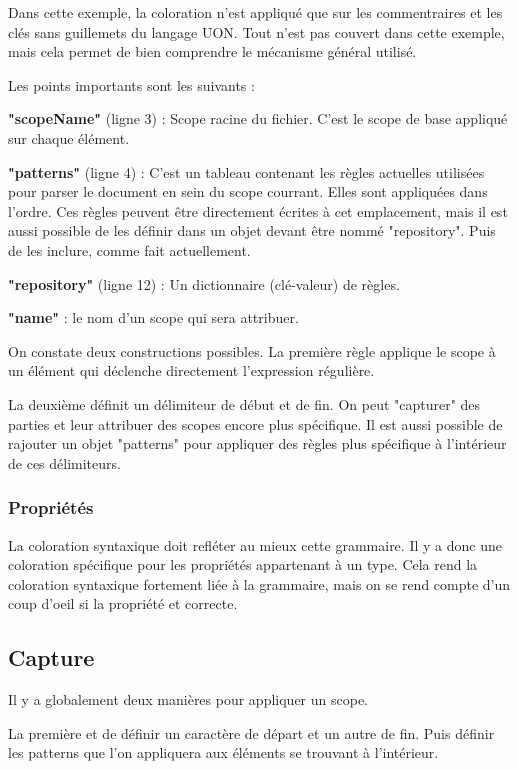 \documentclass[
    iict, %
    il, %
]{heig-tb}
\begin{document}
Dans cette exemple, la coloration n'est appliqué que sur les commentraires et les clés sans guillemets du langage UON.
Tout n'est pas couvert dans cette exemple, mais cela permet de bien comprendre le mécanisme général utilisé.

Les points importants sont les suivants :

\textbf{"scopeName"} (ligne 3) : Scope racine du fichier. C'est le scope de base appliqué sur chaque élément.

\textbf{"patterns"} (ligne 4) :
C'est un tableau contenant les règles actuelles utilisées pour parser le document en sein du scope courrant.
Elles sont appliquées dans l'ordre.
Ces règles peuvent être directement écrites à cet emplacement, mais il est aussi possible de les définir dans un objet devant être nommé "repository". Puis de les inclure, comme fait actuellement.

\textbf{"repository"} (ligne 12) : Un dictionnaire (clé-valeur) de règles.

\textbf{"name"} : le nom d'un scope qui sera attribuer.

On constate deux constructions possibles.
La première règle applique le scope à un élément qui déclenche directement l'expression régulière.

La deuxième définit un délimiteur de début et de fin.
On peut "capturer" des parties et leur attribuer des scopes encore plus spécifique.
Il est aussi possible de rajouter un objet "patterns" pour appliquer des règles plus spécifique à l'intérieur de ces délimiteurs.

\subsubsection{Propriétés}

La coloration syntaxique doit refléter au mieux cette grammaire. Il y a donc une coloration spécifique pour les propriétés appartenant à un type.
Cela rend la coloration syntaxique fortement liée à la grammaire, mais on se rend compte d'un coup d'oeil si la propriété et correcte.

\subsection{Capture}


Il y a globalement deux manières pour appliquer un scope.

La première et de définir un caractère de départ et un autre de fin. Puis définir les patterns que l'on appliquera aux éléments se trouvant à l'intérieur.
\end{document}
